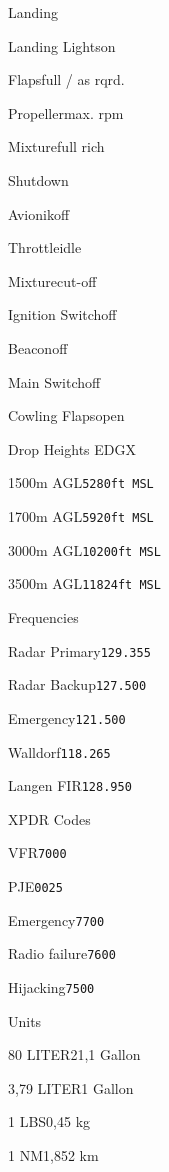 \begin{checklist}{Landing}
  \item{Landing Lights}{on}
  \item{Flaps}{full / as rqrd.}
  \item{Propeller}{max. rpm}
  \item{Mixture}{full rich}
\end{checklist}

\begin{checklist}{Shutdown}
  \item{Avionik}{off}
  \item{Throttle}{idle}
  \item{Mixture}{cut-off}
  \item{Ignition Switch}{off}
  \item{Beacon}{off}
  \item{Main Switch}{off}
  \item{Cowling Flaps}{open}
\end{checklist}

\begin{checklist}{Drop Heights EDGX}
  \item{1500m AGL}{\texttt{5280ft MSL}}
  \item{1700m AGL}{\texttt{5920ft MSL}}
  \item{3000m AGL}{\texttt{10200ft MSL}}
  \item{3500m AGL}{\texttt{11824ft MSL}}
\end{checklist}

\begin{checklist}{Frequencies}
  \item{Radar Primary}{\texttt{129.355}}
  \item{Radar Backup}{\texttt{127.500}}
  \item{Emergency}{\texttt{121.500}}
  \item{Walldorf}{\texttt{118.265}}
  \item{Langen FIR}{\texttt{128.950}}
\end{checklist}

\begin{checklist}{XPDR Codes}
  \item{VFR}{\texttt{7000}}
  \item{PJE}{\texttt{0025}}
  \item{Emergency}{\texttt{7700}}
  \item{Radio failure}{\texttt{7600}}
  \item{Hijacking}{\texttt{7500}}
\end{checklist}

\begin{checklist}{Units}
  \item{80 LITER}{21,1 Gallon}
  \item{3,79 LITER}{1 Gallon}
  \item{1 LBS}{0,45 kg}
  \item{1 NM}{1,852 km}

\end{checklist}


